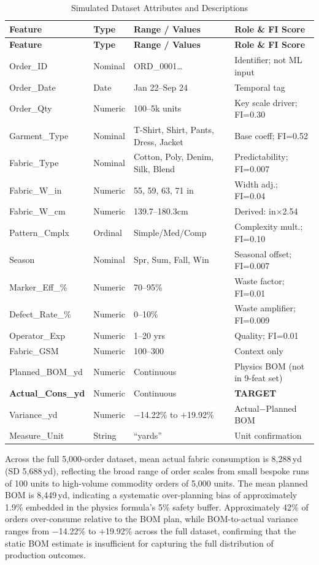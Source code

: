{\scriptsize\tabcolsep=3pt
\begin{longtable}{@{}L{2.8cm} C{1.2cm} L{3.2cm} L{7.2cm}@{}}
  \caption{Simulated Dataset Attributes and Descriptions}
  \label{tab:dataset}\\
  \toprule
  \textbf{Feature}&\textbf{Type}&\textbf{Range / Values}&\textbf{Role \& FI Score}\\
  \midrule\endfirsthead
  \toprule
  \textbf{Feature}&\textbf{Type}&\textbf{Range / Values}&\textbf{Role \& FI Score}\\
  \midrule\endhead\bottomrule\endfoot
  Order\_ID&Nominal&ORD\_0001\ldots&Identifier; not ML input\\
  Order\_Date&Date&Jan 22--Sep 24&Temporal tag\\
  Order\_Qty&Numeric&100--5k units&Key scale driver; FI=0.30\\
  Garment\_Type&Nominal&T-Shirt, Shirt, Pants, Dress, Jacket&Base coeff; FI=0.52\\
  Fabric\_Type&Nominal&Cotton, Poly, Denim, Silk, Blend&Predictability; FI=0.007\\
  Fabric\_W\_in&Numeric&55, 59, 63, 71 in&Width adj.; FI=0.04\\
  Fabric\_W\_cm&Numeric&139.7--180.3cm&Derived: in$\times$2.54\\
  Pattern\_Cmplx&Ordinal&Simple/Med/Comp&Complexity mult.; FI=0.10\\
  Season&Nominal&Spr, Sum, Fall, Win&Seasonal offset; FI=0.007\\
  Marker\_Eff\_\%&Numeric&70--95\%&Waste factor; FI=0.01\\
  Defect\_Rate\_\%&Numeric&0--10\%&Waste amplifier; FI=0.009\\
  Operator\_Exp&Numeric&1--20 yrs&Quality; FI=0.01\\
  Fabric\_GSM&Numeric&100--300&Context only\\
  Planned\_BOM\_yd&Numeric&Continuous&Physics BOM (not in 9-feat set)\\
  \textbf{Actual\_Cons\_yd}&Numeric&Continuous&\textbf{TARGET}\\
  Variance\_yd&Numeric&$-$14.22\% to $+$19.92\%&Actual$-$Planned BOM\\
  Measure\_Unit&String&``yards''&Unit confirmation\\
\end{longtable}
}

\noindent Across the full 5{,}000-order dataset, mean actual fabric consumption is 8{,}288\,yd (SD 5{,}688\,yd), reflecting the broad range of order scales from small bespoke runs of 100 units to high-volume commodity orders of 5{,}000 units. The mean planned BOM is 8{,}449\,yd, indicating a systematic over-planning bias of approximately 1.9\% embedded in the physics formula's 5\% safety buffer. Approximately 42\% of orders over-consume relative to the BOM plan, while BOM-to-actual variance ranges from $-$14.22\% to $+$19.92\% across the full dataset, confirming that the static BOM estimate is insufficient for capturing the full distribution of production outcomes.

